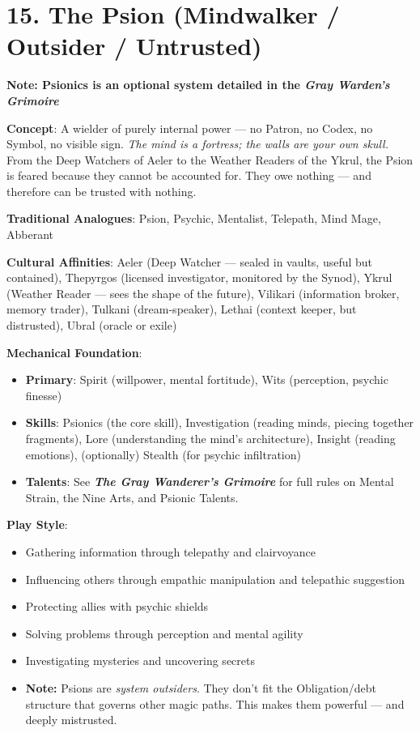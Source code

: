 \section{15. The Psion (Mindwalker / Outsider / Untrusted)}
\label{sec:concept-psion}

\textbf{Note: Psionics is an optional system detailed in the \textit{Gray Warden's Grimoire}}

\textbf{Concept}: A wielder of purely internal power --- no Patron, no Codex, no Symbol, no visible sign. \emph{The mind is a fortress; the walls are your own skull.} From the Deep Watchers of Aeler to the Weather Readers of the Ykrul, the Psion is feared because they cannot be accounted for. They owe nothing --- and therefore can be trusted with nothing.

\textbf{Traditional Analogues}: Psion, Psychic, Mentalist, Telepath, Mind Mage, Abberant

\textbf{Cultural Affinities}: Aeler (Deep Watcher --- sealed in vaults, useful but contained), Thepyrgos (licensed investigator, monitored by the Synod), Ykrul (Weather Reader --- sees the shape of the future), Vilikari (information broker, memory trader), Tulkani (dream-speaker), Lethai (context keeper, but distrusted), Ubral (oracle or exile)

\textbf{Mechanical Foundation}:
\begin{itemize}
\item \textbf{Primary}: Spirit (willpower, mental fortitude), Wits (perception, psychic finesse)
\item \textbf{Skills}: Psionics (the core skill), Investigation (reading minds, piecing together fragments), Lore (understanding the mind's architecture), Insight (reading emotions), (optionally) Stealth (for psychic infiltration)
\item \textbf{Talents}: See \textbf{\textit{The Gray Wanderer's Grimoire}} for full rules on Mental Strain, the Nine Arts, and Psionic Talents.
\end{itemize}

\textbf{Play Style}:
\begin{itemize}
\item Gathering information through telepathy and clairvoyance
\item Influencing others through empathic manipulation and telepathic suggestion
\item Protecting allies with psychic shields
\item Solving problems through perception and mental agility
\item Investigating mysteries and uncovering secrets
\item \textbf{Note:} Psions are \emph{system outsiders}. They don't fit the Obligation/debt structure that governs other magic paths. This makes them powerful --- and deeply mistrusted.
\end{itemize}

